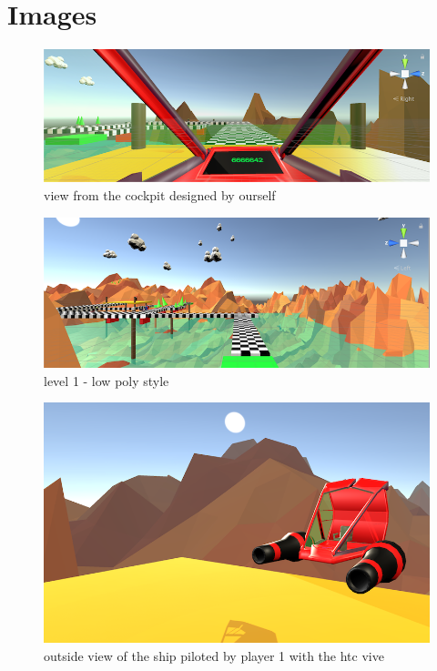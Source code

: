 \documentclass[12pt]{article}
\begin{document}
\newpage

\section{Images}
\begin{figure}[h]
   \caption{\label{étiquette} view from the cockpit designed by ourself}
   \includegraphics[scale=1]{images/cockpit.png}
\end{figure}

\begin{figure}[h]
   \caption{\label{étiquette} level 1 - low poly style}
   \includegraphics[scale=1]{images/level.png}
\end{figure}

\begin{figure}[!h]
   \caption{\label{étiquette} outside view of the ship piloted by player 1 with the htc vive}
   \includegraphics[scale=0.6]{images/ship.png}
\end{figure}
\end{document}
